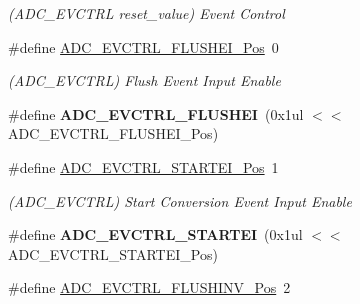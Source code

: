 \begin{DoxyCompactItemize}
\begin{DoxyCompactList}\small\item\em (A\+D\+C\+\_\+\+E\+V\+C\+T\+R\+L reset\+\_\+value) Event Control \end{DoxyCompactList}\item 
\hypertarget{group___s_a_m_l21___a_d_c_ga7e43c435c6e972cd3d1ba58929fa98dc}{}\#define \hyperlink{group___s_a_m_l21___a_d_c_ga7e43c435c6e972cd3d1ba58929fa98dc}{A\+D\+C\+\_\+\+E\+V\+C\+T\+R\+L\+\_\+\+F\+L\+U\+S\+H\+E\+I\+\_\+\+Pos}~0\label{group___s_a_m_l21___a_d_c_ga7e43c435c6e972cd3d1ba58929fa98dc}

\begin{DoxyCompactList}\small\item\em (A\+D\+C\+\_\+\+E\+V\+C\+T\+R\+L) Flush Event Input Enable \end{DoxyCompactList}\item 
\hypertarget{group___s_a_m_l21___a_d_c_gac02776417af504ca4379300bbca0b9d7}{}\#define {\bfseries A\+D\+C\+\_\+\+E\+V\+C\+T\+R\+L\+\_\+\+F\+L\+U\+S\+H\+E\+I}~(0x1ul $<$$<$ A\+D\+C\+\_\+\+E\+V\+C\+T\+R\+L\+\_\+\+F\+L\+U\+S\+H\+E\+I\+\_\+\+Pos)\label{group___s_a_m_l21___a_d_c_gac02776417af504ca4379300bbca0b9d7}

\item 
\hypertarget{group___s_a_m_l21___a_d_c_gaf92080afb69dadfd33cc3d2b155a966b}{}\#define \hyperlink{group___s_a_m_l21___a_d_c_gaf92080afb69dadfd33cc3d2b155a966b}{A\+D\+C\+\_\+\+E\+V\+C\+T\+R\+L\+\_\+\+S\+T\+A\+R\+T\+E\+I\+\_\+\+Pos}~1\label{group___s_a_m_l21___a_d_c_gaf92080afb69dadfd33cc3d2b155a966b}

\begin{DoxyCompactList}\small\item\em (A\+D\+C\+\_\+\+E\+V\+C\+T\+R\+L) Start Conversion Event Input Enable \end{DoxyCompactList}\item 
\hypertarget{group___s_a_m_l21___a_d_c_ga687923a1cf753077b5593b2f88016ff4}{}\#define {\bfseries A\+D\+C\+\_\+\+E\+V\+C\+T\+R\+L\+\_\+\+S\+T\+A\+R\+T\+E\+I}~(0x1ul $<$$<$ A\+D\+C\+\_\+\+E\+V\+C\+T\+R\+L\+\_\+\+S\+T\+A\+R\+T\+E\+I\+\_\+\+Pos)\label{group___s_a_m_l21___a_d_c_ga687923a1cf753077b5593b2f88016ff4}

\item 
\hypertarget{group___s_a_m_l21___a_d_c_ga9d5e64bc7d34bbf04f17078d1d0912af}{}\#define \hyperlink{group___s_a_m_l21___a_d_c_ga9d5e64bc7d34bbf04f17078d1d0912af}{A\+D\+C\+\_\+\+E\+V\+C\+T\+R\+L\+\_\+\+F\+L\+U\+S\+H\+I\+N\+V\+\_\+\+Pos}~2\label{group___s_a_m_l21___a_d_c_ga9d5e64bc7d34bbf04f17078d1d0912af}


\end{DoxyCompactItemize}
